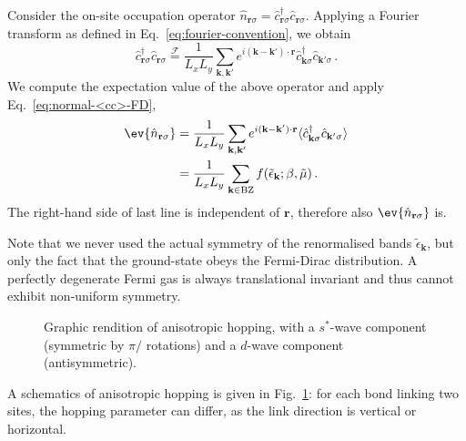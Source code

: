 \begin{tabproof}

	Consider the on-site occupation operator $\hat n_{\mathbf{r}\sigma} = \hat c_{\mathbf{r}\sigma}^\dagger \hat c_{\mathbf{r}\sigma}$. Applying a Fourier transform as defined in Eq.~\eqref{eq:fourier-convention}, we obtain
	\[
		\hat c_{\mathbf{r}\sigma}^\dagger \hat c_{\mathbf{r}\sigma} \stackrel{\mathcal{F}}{=} \frac{1}{L_x L_y} \sum_{\mathbf{k}, \mathbf{k}'} e^{i (\mathbf{k}-\mathbf{k}') \cdot\mathbf{r}} \hat c_{\mathbf{k}\sigma}^\dagger \hat c_{\mathbf{k}'\sigma} \, .
	\]
	We compute the expectation value of the above operator and apply Eq.~\eqref{eq:normal-<cc>-FD},
	\[
	\begin{aligned}
		\ev{\hat n_{\mathbf{r}\sigma}} &= \frac{1}{L_x L_y} \sum_{\mathbf{k}, \mathbf{k}'} e^{i (\mathbf{k}-\mathbf{k}') \cdot\mathbf{r}} \langle
			\hat c_{\mathbf{k}\sigma}^\dagger \hat c_{\mathbf{k}'\sigma}
		\rangle \\
		&= \frac{1}{L_x L_y} \sum_{\mathbf{k}\in\mathrm{BZ}} f(\tilde{\epsilon}_\mathbf{k};\beta,\tilde{\mu}) \, .
	\end{aligned}
	\]
	The right-hand side of last line is independent of $\mathbf{r}$, therefore also $\ev{\hat n_{\mathbf{r}\sigma}}$ is.
\end{tabproof}
%
Note that we never used the actual symmetry of the renormalised bands $\tilde{\epsilon}_\mathbf{k}$, but only the fact that the ground-state obeys the Fermi-Dirac distribution. A perfectly degenerate Fermi gas is always translational invariant and thus cannot exhibit non-uniform symmetry.

\begin{figure}
	\centering
	
	\caption{Graphic rendition of anisotropic hopping, with a $s^*$-wave component (symmetric by $\pi/$ rotations) and a $d$-wave component (antisymmetric).}
	\label{fig:anisotropic-hopping}
\end{figure}

A schematics of anisotropic hopping is given in Fig.~\ref{fig:anisotropic-hopping}: for each bond linking two sites, the hopping parameter can differ, as the link direction is vertical or horizontal.

